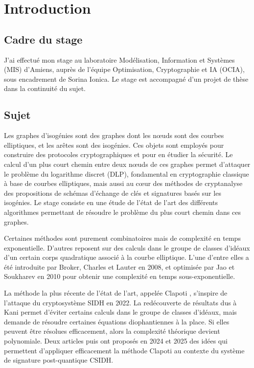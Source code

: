 
\section{Introduction}

\subsection{Cadre du stage}

J'ai effectué mon stage au laboratoire Modélisation, Information et Systèmes (MIS) d'Amiens, auprès de l'équipe Optimisation, Cryptographie et IA (OCIA), sous encadrement de Sorina Ionica. Le stage est accompagné d'un projet de thèse dans la continuité du sujet. 

\subsection{Sujet}

Les graphes d’isogénies sont des graphes dont les nœuds sont des courbes elliptiques, et les arêtes sont des isogénies. Ces objets sont employés pour construire des protocoles cryptographiques et pour en étudier la sécurité. Le calcul d'un plus court chemin entre deux nœuds de ces graphes permet d’attaquer le problème du logarithme discret (DLP), fondamental en cryptographie classique à base de courbes elliptiques, mais aussi au cœur des méthodes de cryptanalyse des propositions de schémas d’échange de clés et signatures basés sur les isogénies. Le stage consiste en une étude de l’état de l’art des différents algorithmes permettant de résoudre le problème du plus court chemin dans ces graphes.

Certaines méthodes sont purement combinatoires mais de complexité en temps exponentielle. D'autres reposent sur des calculs dans le groupe de classes d’idéaux d’un certain corps quadratique associé à la courbe elliptique. L'une d'entre elles a été introduite par Broker, Charles et Lauter \cite{BrokerCharlesLauter} en 2008, et optimisée par Jao et Soukharev \cite{JaoSoukharev} en 2010 pour obtenir une complexité en temps sous-exponentielle.

La méthode la plus récente de l'état de l'art, appelée Clapoti \cite{Clapoti}, s'inspire de l'attaque du cryptosystème SIDH en 2022. La redécouverte de résultats dus à Kani permet d'éviter certains calculs dans le groupe de classes d'idéaux, mais demande de résoudre certaines équations diophantiennes à la place. Si elles peuvent être résolues efficacement, alors la complexité théorique devient polynomiale. Deux articles \cite{KLaPoTi} puis \cite{Pegasis} ont proposés en 2024 et 2025 des idées qui permettent d'appliquer efficacement la méthode Clapoti au contexte du système de signature post-quantique CSIDH. 

